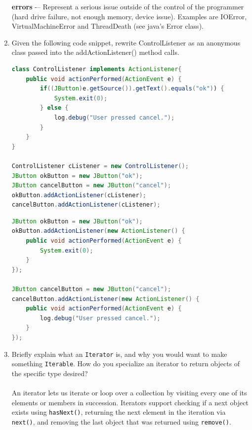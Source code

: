 \documentclass[11pt]{article}
\newenvironment{answer}{\large\lstset{basicstyle=\tiny\ttfamily}\color{white} }{}
\newenvironment{answer}{\large\lstset{basicstyle=\large\ttfamily}\color{red} }{}
\begin{document}
\begin{enumerate}
\begin{answer}
\textbf{errors} -– Represent a serious issue outside of the control of the programmer (hard drive
failure, not enough memory, device issue). Examples are IOError, VirtualMachineError and
ThreadDeath (see java's Error class).
\end{answer}



\item Given the following code snippet, rewrite ControlListener as an anonymous class passed into the addActionListener() method calls.  
\begin{lstlisting}[language=java]
class ControlListener implements ActionListener{
	public void actionPerformed(ActionEvent e) {
		if((JButton)e.getSource()).getText().equals("ok")) {
			System.exit(0);
		} else {
			log.debug("User pressed cancel.");
		}
	}
}

ControlListener cListener = new ControlListener();
JButton okButton = new JButton("ok");
JButton cancelButton = new JButton("cancel");
okButton.addActionListener(cListener);
cancelButton.addActionListener(cListener);
\end{lstlisting}
\begin{answer}
\begin{lstlisting}[language=java]
JButton okButton = new JButton("ok");
okButton.addActionListener(new ActionListener() {
	public void actionPerformed(ActionEvent e) {
		System.exit(0);
	}
});

JButton cancelButton = new JButton("cancel");
cancelButton.addActionListener(new ActionListener() {
	public void actionPerformed(ActionEvent e) {
		log.debug("User pressed cancel.");
	}
});
\end{lstlisting}
\end{answer}
\newpage

\item Briefly explain what an \texttt{Iterator} is, and why you would want
to make something \texttt{Iterable}. How do you specialize an iterator to return objects of the specific type desired? \\ \\
\begin{answer}
An iterator lets us iterate or loop over a collection by visiting every one of its elements or members in succession.
Iterators support checking if a next object exists using \texttt{hasNext()}, returning the next element in the iteration via \texttt{next()}, and removing the last object that was returned using \texttt{remove()}.


\end{answer}
\end{enumerate}
\end{document}
